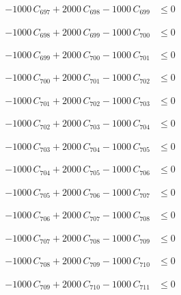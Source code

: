 \documentclass[a4paper,11pt]{article}
\begin{document}
\begin{align}
-1000\,C_{697} + 2000\,C_{698} - 1000\,C_{699} &\leq 0 \nonumber
\end{align}

\begin{align}
-1000\,C_{698} + 2000\,C_{699} - 1000\,C_{700} &\leq 0 \nonumber
\end{align}

\begin{align}
-1000\,C_{699} + 2000\,C_{700} - 1000\,C_{701} &\leq 0 \nonumber
\end{align}

\begin{align}
-1000\,C_{700} + 2000\,C_{701} - 1000\,C_{702} &\leq 0 \nonumber
\end{align}

\begin{align}
-1000\,C_{701} + 2000\,C_{702} - 1000\,C_{703} &\leq 0 \nonumber
\end{align}

\begin{align}
-1000\,C_{702} + 2000\,C_{703} - 1000\,C_{704} &\leq 0 \nonumber
\end{align}

\begin{align}
-1000\,C_{703} + 2000\,C_{704} - 1000\,C_{705} &\leq 0 \nonumber
\end{align}

\begin{align}
-1000\,C_{704} + 2000\,C_{705} - 1000\,C_{706} &\leq 0 \nonumber
\end{align}

\begin{align}
-1000\,C_{705} + 2000\,C_{706} - 1000\,C_{707} &\leq 0 \nonumber
\end{align}

\begin{align}
-1000\,C_{706} + 2000\,C_{707} - 1000\,C_{708} &\leq 0 \nonumber
\end{align}

\begin{align}
-1000\,C_{707} + 2000\,C_{708} - 1000\,C_{709} &\leq 0 \nonumber
\end{align}

\begin{align}
-1000\,C_{708} + 2000\,C_{709} - 1000\,C_{710} &\leq 0 \nonumber
\end{align}

\begin{align}
-1000\,C_{709} + 2000\,C_{710} - 1000\,C_{711} &\leq 0 \nonumber
\end{align}
\end{document}
